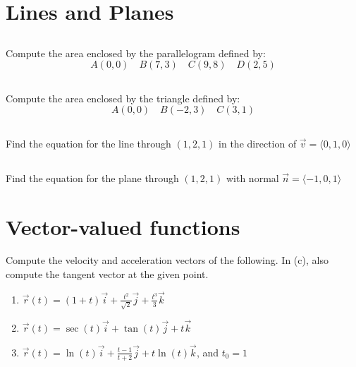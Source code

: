 \documentclass[letterpaper, 11pt]{article}
\begin{document}
\section{Lines and Planes}
\subsection{} Compute the area enclosed by the parallelogram defined by:
\[ A(0,0) \quad B(7,3) \quad C(9,8) \quad D(2,5) \]

\subsection{} Compute the area enclosed by the triangle defined by:
\[ A(0, 0)\quad B(-2,3)\quad C(3, 1) \]

\subsection{} Find the equation for the line through $(1,2,1)$ in the direction of $\vec v = \langle 0, 1, 0 \rangle$

\subsection{} Find the equation for the plane through $(1,2,1)$ with normal $\vec n = \langle -1, 0, 1 \rangle$


\section{Vector-valued functions}
Compute the velocity and acceleration vectors of the following. In (c), also compute the tangent vector at the given point.
\begin{enumerate}[label = (\alph*)]
\item $\vec r (t) = (1 + t) \vec i + \frac{t^2}{\sqrt{2}} \vec j + \frac{t^3}{3} \vec k$

\item $\vec r(t) = \sec(t) \vec i + \tan (t) \vec j + t\vec k$

\item $\vec r(t) =  \ln(t) \vec i+\frac{t - 1}{t + 2} \vec j +t\ln(t) \vec k$, and $t_0 = 1$

\end{enumerate}
\end{document}
